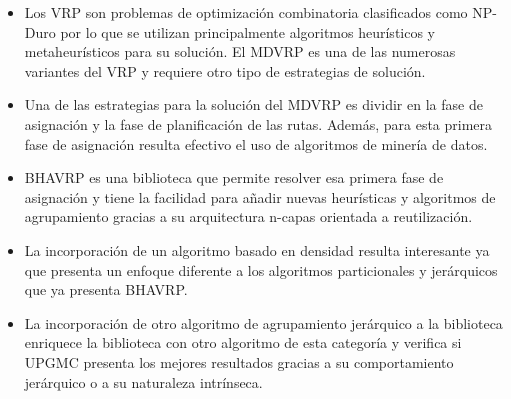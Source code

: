 \begin{itemize}
  \item Los VRP son problemas de optimizaci\'on combinatoria clasificados como NP-Duro por lo que se utilizan principalmente algoritmos heur\'isticos y metaheur\'isticos para su soluci\'on. El MDVRP es una de las numerosas variantes del VRP y requiere otro tipo de estrategias de soluci\'on.
  \item Una de las estrategias para la soluci\'on del MDVRP es dividir en la fase de asignaci\'on y la fase de planificaci\'on de las rutas. Adem\'as, para esta primera fase de asignaci\'on resulta efectivo el uso de algoritmos de miner\'ia de datos.
  \item BHAVRP es una biblioteca que permite resolver esa primera fase de asignaci\'on y tiene la facilidad para a\~nadir nuevas heur\'isticas y algoritmos de agrupamiento gracias a su arquitectura n-capas orientada a reutilizaci\'on.
  \item La incorporaci\'on de un algoritmo basado en densidad resulta interesante ya que presenta un enfoque diferente a los algoritmos particionales y jer\'arquicos que ya presenta BHAVRP.
  \item La incorporaci\'on de otro algoritmo de agrupamiento jer\'arquico a la biblioteca enriquece la biblioteca con otro algoritmo de esta categor\'ia y verifica si UPGMC presenta los mejores resultados gracias a su comportamiento jer\'arquico o a su naturaleza intr\'inseca.
\end{itemize}